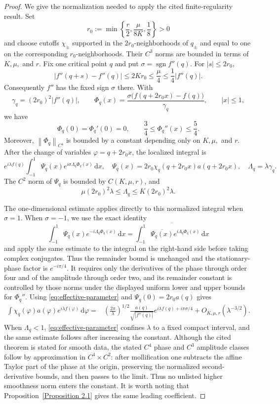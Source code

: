 \documentclass[12pt]{article}
\numberwithin{equation}{section}
\numberwithin{equation}{section}
\newcommand{\dd}{\,\mathrm{d}}
\begin{document}
\begin{proof}
We give the normalization needed to apply the cited finite-regularity result.
Set
\[
 r_0:=\min\left\{\frac r2,\frac{\mu}{8K},\frac18\right\}>0
\]
and choose cutoffs $\chi_\pm$ supported in the $2r_0$-neighborhoods of
$q_\pm$ and equal to one on the corresponding $r_0$-neighborhoods. Their
$C^3$ norms are bounded in terms of $K,\mu,$ and $r$. Fix one critical
point $q$ and put $\sigma=\operatorname{sgn}f''(q)$. For $|s|\le2r_0$,
\[
 \left|f''(q+s)-f''(q)\right|\le 2Kr_0\le\frac\mu4
 \le\frac14\left|f''(q)\right|.
\]
Consequently $f''$ has the fixed sign $\sigma$ there. With
\[
 \gamma_q=\left(2r_0\right)^2\left|f''(q)\right|,
 \qquad
 \Phi_q(x)=
 \frac{\sigma\bigl(f\left(q+2r_0x\right)-f(q)\bigr)}{\gamma_q},
 \qquad |x|\le1,
\]
we have
\[
 \Phi_q(0)=\Phi_q'(0)=0,
 \qquad
 \frac34\le\Phi_q''(x)\le\frac54.
\]
Moreover, $\left\|\Phi_q\right\|_{C^4}$ is bounded by a constant depending only on
$K,\mu,$ and $r$. After the change of variables
$\varphi=q+2r_0x$, the localized integral is
\[
 e^{i\lambda f(q)}
 \int_{-1}^{1}\Psi_q(x)
 e^{i\sigma\Lambda_q\Phi_q(x)}\dd x,
 \quad
 \Psi_q(x)=2r_0\chi_q\left(q+2r_0x\right)a\left(q+2r_0x\right),
 \quad
 \Lambda_q=\lambda\gamma_q.
\]
The $C^2$ norm of $\Psi_q$ is bounded by $C(K,\mu,r)$, and
\begin{equation}\label{eq:effective-parameter}
 \mu\left(2r_0\right)^2\lambda
 \le\Lambda_q\le K\left(2r_0\right)^2\lambda.
\end{equation}

The one-dimensional estimate \cite[Theorem 2.1(2)]{Guo} applies directly to
this normalized integral when $\sigma=1$. When $\sigma=-1$, we use the exact
identity
\[
 \int_{-1}^{1}\Psi_q(x)e^{-i\Lambda_q\Phi_q(x)}\dd x
 =\overline{\int_{-1}^{1}\overline{\Psi_q(x)}
 e^{i\Lambda_q\Phi_q(x)}\dd x}
\]
and apply the same estimate to the integral on the right-hand side before
taking complex conjugates. Thus the remainder bound is unchanged and the
stationary-phase factor is $e^{-i\pi/4}$.
It requires only the derivatives of the phase through order four and of the
amplitude through order two, and its remainder constant is controlled by
those norms under the displayed uniform lower and upper bounds for
$\Phi_q''$. Using \eqref{eq:effective-parameter} and
$\Psi_q(0)=2r_0a(q)$ gives
\begin{align*}
 \int \chi_q(\varphi)a(\varphi)e^{i\lambda f(\varphi)}\dd\varphi
 ={}&\left(\frac{2\pi}{\lambda}\right)^{1/2}
 \frac{a(q)}{\sqrt{|f''(q)|}}
 e^{i\lambda f(q)+i\pi\sigma/4}
 +O_{K,\mu,r}(\lambda^{-3/2}).
\end{align*}
When $\Lambda_q<1$, \eqref{eq:effective-parameter} confines $\lambda$ to a
fixed compact interval, and the same estimate follows after increasing the
constant. Although the cited theorem is stated for smooth data, the stated
$C^4$ phase and $C^3$ amplitude classes follow by approximation in
$C^4\times C^2$: after mollification one subtracts the affine Taylor part of
the phase at the origin, preserving the normalized second-derivative bounds,
and then passes to the limit. Thus no unlisted higher smoothness norm enters
the constant. It is worth noting that Proposition~\ref{Proposition 2.1} gives the same leading coefficient.


\end{proof}
\end{document}
